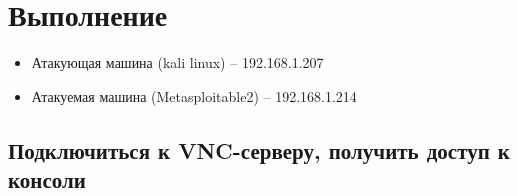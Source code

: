\documentclass[utf8x, 12pt]{G7-32}
\begin{document}
\chapter{Выполнение}

\begin{itemize}
	\item Атакующая машина (kali linux) – 192.168.1.207
	\item Атакуемая машина (Metasploitable2) – 192.168.1.214
\end{itemize}



\newpage
\section{Подключиться к VNC-серверу, получить доступ к консоли}
\end{document}

